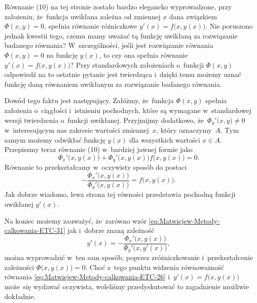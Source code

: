 \documentclass[a4paper,11pt]{article}
\numberwithin{equation}{section}
\begin{document}
\VerSpaceFour





\noindent
{} Równanie (10) na tej stronie zostało bardzo elegancko wyprowadzone,
przy założeniu, że~funkcja uwikłana zależna od zmiennej $x$ dana związkiem
$\Phi( x, y ) = 0$, spełnia równanie różniczkowe
$y'( x ) = f\big( x, y( x ) \big)$. Nie poruszono jednak kwestii tego, czemu
mamy uważać tą funkcję uwikłaną za rozwiązanie badanego równania?
W~szczególności, jeśli jest rozwiązanie równania $\Phi( x, y ) = 0$ na funkcję
$y( x )$, to czy ona spełnia równanie $y'( x ) = f\big( x, y( x ) \big)$?
Przy standardowych założeniach o~funkcji $\Phi( x, y )$ odpowiedź na to
ostatnie pytanie jest twierdząca i~dzięki temu możemy uznać funkcję daną
równaniem uwikłanym za rozwiązanie badanego równania.

Dowód tego faktu jest następujący. Załóżmy, że~funkcja $\Phi( x, y )$ spełnia
założenia o~ciągłości i~istnieniu pochodnych, które są wymagane
w~standardowej wersji twierdzenia o~funkcji uwikłanej. Przyjmijmy dodatkowo,
że~$\Phi_{ y }'\big( x, y \big) \neq 0$ w~interesującym nas zakresie wartości
zmiennej~$x$, który oznaczymy~$A$. Tym samym możemy odwikłać funkcję
$y( x )$ dla wszystkich wartości $x \in A$. Przepiszmy teraz równanie (10)
w~bardziej jawnej formie jako
\begin{equation}
  \label{eq:Matwiejew-Metody-calkowania-ETC-31}
  \Phi_{ x }'\big( x, y( x ) \big) +
  \Phi_{ y }'\big( x, y( x ) \big) f\big( x, y( x ) \big) = 0.
\end{equation}
Równanie to przekształcamy w~oczywisty sposób do postaci
\begin{equation}
  \label{eq:Matwiejew-Metody-calkowania-ETC-32}
  -\frac{ \Phi_{ x }'\big( x, y( x ) \big) }
  { \Phi_{ y }'\big( x, y( x ) \big) } =
  f\big( x, y( x ) \big).
\end{equation}
Jak dobrze wiadomo, lewa strona tej równości przedstawia pochodną funkcji
uwikłanej $y'( x )$.

Na koniec możemy zauważyć, że~zarówno wzór
\eqref{eq:Matwiejew-Metody-calkowania-ETC-31} jak i~dobrze znaną zależność
\begin{equation}
  \label{eq:Matwiejew-Metody-calkowania-ETC-33}
  y'( x ) =
  -\frac{ \Phi_{ x }'\big( x, y( x ) \big) }{ \Phi_{ y }'\big( x, y'( x ) \big) },
\end{equation}
można wyprowadzić w~ten sam sposób, poprzez zróżniczkowanie
i~przekształcenie zależności $\Phi\big( x, y( x ) \big) = 0$. Choć z~tego
punktu widzenia równoważność równania
\eqref{eq:Matwiejew-Metody-calkowania-ETC-26}
i~$y'( x ) = f\big( x, y( x ) \big)$ może~się wydawać oczywista, woleliśmy
przedyskutować to zagadnienie możliwie dokładnie.
\end{document}
